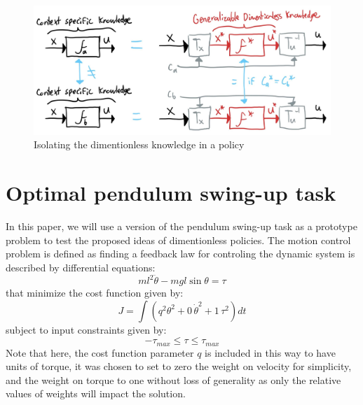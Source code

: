 \begin{figure}[t]
\vspace{-5pt}
\begin{center}
\includegraphics[width=0.99\linewidth]{fig/dimpol.jpg}
\caption{Isolating the dimentionless knowledge in a policy}\label{fig:dimpol}
\end{center}
\vspace{-15pt}
\end{figure}



 








\section{Optimal pendulum swing-up task}
\label{sec:optimalswingup}
In this paper, we will use a version of the pendulum swing-up task as a prototype problem to test the proposed ideas of dimentionless policies. The motion control problem is defined as finding a feedback law for controling the dynamic system is described by differential equations:
\begin{equation}
ml^2 \ddot{\theta} - mgl \sin \theta = \tau
\label{eq:pendulum_dynamics}
\end{equation}
that minimize the cost function given by:
\begin{equation}
J = \int{( q^2 \theta^2 + 0 \, \dot{\theta}^2 + 1 \, \tau^2 ) dt }
\label{eq:pendulum_cost}
\end{equation}
subject to input constraints given by:
\begin{equation}
- \tau_{max} \leq \tau \leq \tau_{max}
\label{eq:pendulum_constraints}
\end{equation}
Note that here, the cost function parameter $q$ is included in this way to have units of torque, it was chosen to set to zero the weight on velocity for simplicity, and the weight on torque to one without loss of generality as only the relative values of weights will impact the solution. 

